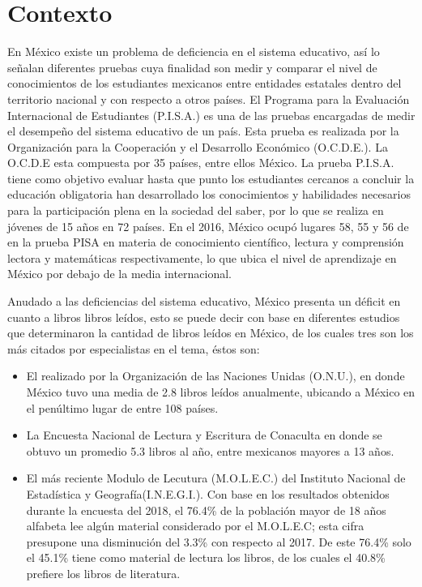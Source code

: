 \section{Contexto}
En México existe un problema de deficiencia en el sistema educativo, así lo
señalan diferentes pruebas cuya finalidad son medir y comparar el nivel de 
conocimientos de los estudiantes mexicanos entre entidades estatales dentro del 
territorio nacional y con respecto a otros países. El Programa para la Evaluación
 Internacional de Estudiantes (P.I.S.A.) es una de las pruebas encargadas de 
medir el desempeño del sistema educativo de un país. Esta prueba es realizada por 
la Organización para la Cooperación y el Desarrollo Económico (O.C.D.E.). La O.C.D.E 
esta compuesta por 35 países, entre ellos México. La prueba P.I.S.A. tiene como 
objetivo evaluar hasta que punto los estudiantes cercanos a concluir la educación 
obligatoria han desarrollado los conocimientos y habilidades necesarios para la 
participación plena en la sociedad del saber\cite{RefOCDE}, por lo que se realiza en 
jóvenes de 15 años en 72 países. En el 2016, México ocupó lugares 58, 55 y 56 de
 en la prueba PISA en materia de conocimiento científico, lectura y comprensión 
lectora y matemáticas respectivamente\cite{RefPisa}, lo que ubica el nivel de 
aprendizaje en México por debajo de la media internacional.
        \\
        \par
Anudado a las deficiencias del sistema educativo, México presenta un 
déficit en cuanto a libros libros leídos, esto se puede decir con base 
en diferentes estudios que determinaron la cantidad de libros leídos en 
México, de los cuales tres son los más citados por especialistas en el 
tema, éstos son: 
	\begin{itemize}
		\item El realizado por la Organización de las Naciones Unidas (O.N.U.), en 
		donde México tuvo una media de 2.8 libros leídos anualmente, ubicando a México
		 en el penúltimo lugar de entre 108 países\cite{RefLibrosCantidad}.
        \item  La Encuesta Nacional de Lectura y Escritura de Conaculta 
        en donde se obtuvo un promedio 5.3 libros al año, entre mexicanos 
        mayores a 13 años\cite{RefLibrosCantidad}.
        \item El más reciente Modulo de Lecutura (M.O.L.E.C.) del Instituto Nacional 
        de Estadística y Geografía(I.N.E.G.I.). Con base en los resultados obtenidos 
        durante la encuesta del 2018, el 76.4\% de la población mayor de 18 años
         alfabeta lee algún material considerado por el M.O.L.E.C; esta cifra 
         presupone una disminución del 3.3\% con respecto al 2017. De este 76.4\% 
         solo el 45.1\% tiene como material de lectura los libros, de los cuales 
         el 40.8\% prefiere los libros de literatura\cite{RefModuloLectura}.
	\end{itemize}	    

